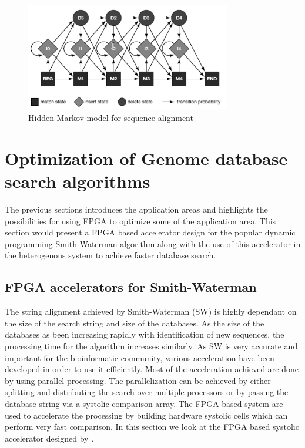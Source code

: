 \documentclass[12pt,twoside]{article}
\begin{document}
\begin{figure}[h]%
    \centering
    \includegraphics[width=0.8\textwidth]{fig/hmm}
    \caption{Hidden Markov model for sequence alignment \cite[Figure 4.16]{mount_bioinformatics:_2004}}
    \label{fig:hmm}
\end{figure}

\section{Optimization of Genome database search algorithms}
\label{sec:designtech}

The previous sections introduces the application areas and highlights the possibilities for using FPGA to optimize some of the application
area. This section would present a FPGA based accelerator design for the popular dynamic programming Smith-Waterman algorithm along
with the use of this accelerator in the heterogenous system to achieve faster database search.

\subsection{FPGA accelerators for Smith-Waterman}
\label{subsec:fpgaaccelerator}

The string alignment achieved by Smith-Waterman (SW) is highly dependant on the size of the search string and size of the databases.
As the size of the databases as been increasing rapidly with identification of new sequences, the processing time for the algorithm
increases similarly. As SW is very accurate and important for the bioinformatic community, various acceleration have been developed
in order to use it efficiently. Most of the acceleration achieved are done by using parallel processing. The parallelization can be achieved
by either splitting and distributing the search over multiple processors \cite{martins_multithreaded_2000, boukerche_parallel_2005, schmidt_massively_2002, rucci_smith-waterman_2014}
or by passing the database string via a systolic comparison array. The FPGA based system are used to accelerate the processing by 
building hardware systolic cells which can perform very fast comparison. In this section we look at the FPGA based systolic accelerator
designed by \textcite{oliver_hyper_2005}.
\end{document}
